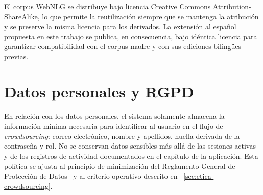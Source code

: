 El corpus WebNLG se distribuye bajo licencia Creative Commons
Attribution-ShareAlike, lo que permite la reutilización siempre que se mantenga
la atribución y se preserve la misma licencia para los derivados. La extensión
al español propuesta en este trabajo se publica, en consecuencia, bajo idéntica
licencia para garantizar compatibilidad con el corpus madre y con sus ediciones
bilingües previas.

\section{Datos personales y RGPD}

En relación con los datos personales, el sistema solamente almacena la
información mínima necesaria para identificar al usuario en el flujo de
\textit{crowdsourcing}: correo electrónico, nombre y apellidos, huella derivada
de la contraseña y rol. No se conservan datos sensibles más allá de las
sesiones activas y de los registros de actividad documentados en el capítulo de
la aplicación. Esta política se ajusta al principio de minimización del
Reglamento General de Protección de Datos~\cite{GDPR2016} y al criterio
operativo descrito en ~\ref{sec:etica-crowdsourcing}.

